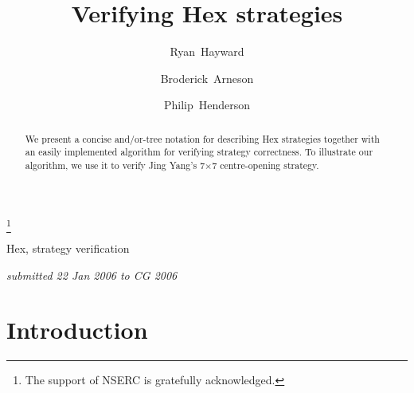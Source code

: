 \documentclass{llncs}
\newcommand{\board}[2]{\mbox{$#1$$\times$$#2$}}
\begin{document}
\begin{frontmatter}

\title{Verifying Hex strategies}\thanks{The 
support of NSERC is gratefully acknowledged.}

\author[A1]{Ryan~Hayward}
\author[A1]{Broderick~Arneson}
\author[A1]{Philip~Henderson}
\address[A1]{Department of Computing Science,
             University of Alberta,
             Edmonton, Alberta, Canada,
         \{hayward,broderic,ph\}@cs.ualberta.ca}

\begin{abstract}
We present a concise and/or-tree notation
for describing Hex strategies
together with an easily implemented algorithm
for verifying strategy correctness.
To illustrate our algorithm, we use it to verify 
Jing Yang's \board{7}{7} centre-opening strategy.
\end{abstract}

\begin{keyword}
Hex, strategy verification
\end{keyword}
\end{frontmatter}

\vspace*{-5in}
{\it submitted 22 Jan 2006 to CG 2006}
\vspace*{5in}



\section{Introduction}
\end{document}
